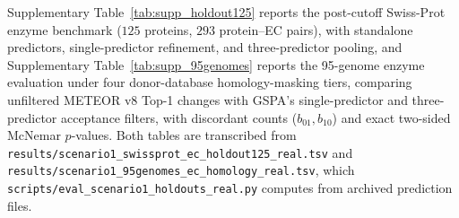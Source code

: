 \documentclass[10pt]{article}
\newcommand{\fn}[1]{\nolinkurl{#1}}
\begin{document}


Supplementary Table~\ref{tab:supp_holdout125} reports the post-cutoff Swiss-Prot enzyme benchmark ($125$ proteins, $293$ protein--EC pairs), with standalone predictors, single-predictor refinement, and three-predictor pooling, and Supplementary Table~\ref{tab:supp_95genomes} reports the 95-genome enzyme evaluation under four donor-database homology-masking tiers, comparing unfiltered METEOR v8 Top-1 changes with GSPA's single-predictor and three-predictor acceptance filters, with discordant counts ($b_{01}, b_{10}$) and exact two-sided McNemar $p$-values. Both tables are transcribed from \fn{results/scenario1_swissprot_ec_holdout125_real.tsv} and \fn{results/scenario1_95genomes_ec_homology_real.tsv}, which \fn{scripts/eval_scenario1_holdouts_real.py} computes from archived prediction files.
\end{document}
